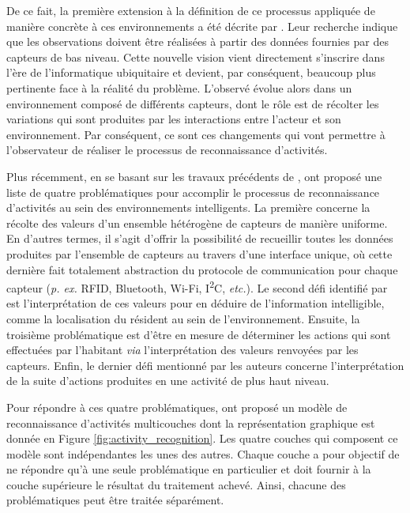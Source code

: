 {{De ce fait, la première extension à la définition de ce processus appliquée de manière concrète à ces environnements a été décrite par \cite{Patterson2005}. Leur recherche indique que les observations doivent être réalisées à partir des données fournies par des capteurs de bas niveau. Cette nouvelle vision vient directement s'inscrire dans l'ère de l'informatique ubiquitaire \citep{Weiser1991} et devient, par conséquent, beaucoup plus pertinente face à la réalité du problème. L'observé évolue alors dans un environnement composé de différents capteurs, dont le rôle est de récolter les variations qui sont produites par les interactions entre l'acteur et son environnement. Par conséquent, ce sont ces changements qui vont permettre à l'observateur de réaliser le processus de reconnaissance d'activités.

Plus récemment, en se basant sur les travaux précédents de \cite{Patterson2005}, \cite{Roy2013} ont proposé une liste de quatre problématiques pour accomplir le processus de reconnaissance d'activités au sein des environnements intelligents. La première concerne la récolte des valeurs d'un ensemble hétérogène de capteurs de manière uniforme. En d'autres termes, il s'agit d'offrir la possibilité de recueillir toutes les données produites par l'ensemble de capteurs au travers d'une interface unique, où cette dernière fait totalement abstraction du protocole de communication pour chaque capteur (\textit{p. ex.} RFID, Bluetooth, Wi-Fi, I\textsuperscript{2}C, \textit{etc.}). Le second défi identifié par \cite{Roy2013} est l'interprétation de ces valeurs pour en déduire de l'information intelligible, comme la localisation du résident au sein de l'environnement. Ensuite, la troisième problématique est d'être en mesure de déterminer les actions qui sont effectuées par l'habitant \textit{via} l'interprétation des valeurs renvoyées par les capteurs. Enfin, le dernier défi mentionné par les auteurs concerne l'interprétation de la suite d'actions produites en une activité de plus haut niveau.

Pour répondre à ces quatre problématiques, \cite{Roy2013} ont proposé un modèle de reconnaissance d'activités multicouches dont la représentation graphique est donnée en Figure \ref{fig:activity_recognition}. Les quatre couches qui composent ce modèle sont indépendantes les unes des autres. Chaque couche a pour objectif de ne répondre qu'à une seule problématique en particulier et doit fournir à la couche supérieure le résultat du traitement achevé. Ainsi, chacune des problématiques peut être traitée séparément.

}}
